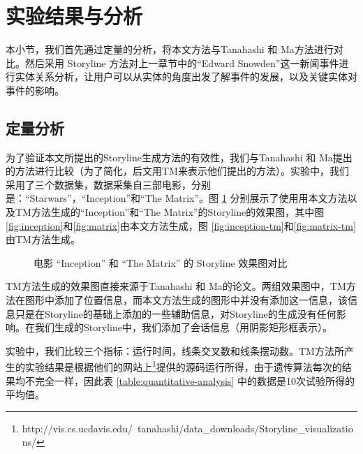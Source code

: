 \section{实验结果与分析}
本小节，我们首先通过定量的分析，将本文方法与Tanahashi 和 Ma\cite{tanahashi2012design}方法进行对比。然后采用 Storyline 方法对上一章节中的“Edward Snowden”这一新闻事件进行实体关系分析，让用户可以从实体的角度出发了解事件的发展，以及关键实体对事件的影响。
\subsection{定量分析}
为了验证本文所提出的Storyline生成方法的有效性，我们与Tanahashi 和 Ma\cite{tanahashi2012design}提出的方法进行比较（为了简化，后文用TM来表示他们提出的方法）。实验中，我们采用了三个数据集，数据采集自三部电影，分别是：“Starwars”，“Inception”和“The Matrix”。图 \ref{fig:layout-comparison} 分别展示了使用用本文方法以及TM方法生成的“Inception”和“The Matrix”的Storyline的效果图，其中图 \ref{fig:inception}和\ref{fig:matrix}由本文方法生成，图 \ref{fig:inception-tm}和\ref{fig:matrix-tm}由TM方法生成。
\begin{figure}[!htb]
    \centering




    \caption{电影 “Inception” 和 “The Matrix” 的 Storyline 效果图对比}
    \label{fig:layout-comparison}
\end{figure}
TM方法生成的效果图直接来源于Tanahashi 和 Ma\cite{tanahashi2012design}的论文。两组效果图中，TM方法在图形中添加了位置信息，而本文方法生成的图形中并没有添加这一信息，该信息只是在Storyline的基础上添加的一些辅助信息，对Storyline的生成没有任何影响。在我们生成的Storyline中，我们添加了会话信息（用阴影矩形框表示）。

实验中，我们比较三个指标：运行时间，线条交叉数和线条摆动数。TM方法所产生的实验结果是根据他们的网站上\footnote{http://vis.cs.ucdavis.edu/~tanahashi/data\_downloads/Storyline\_visualizations/}提供的源码运行所得，由于遗传算法每次的结果均不完全一样，因此表 \ref{table:quantitative-analysis} 中的数据是10次试验所得的平均值。

